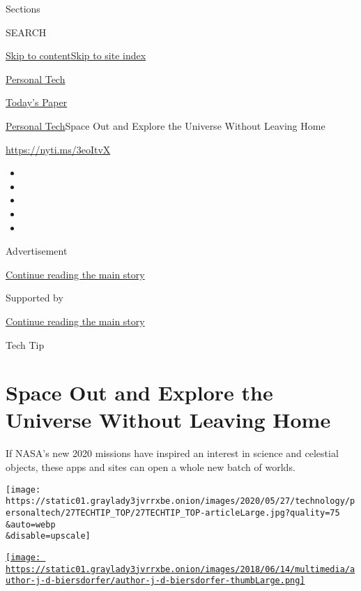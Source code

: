 Sections

SEARCH

\protect\hyperlink{site-content}{Skip to
content}\protect\hyperlink{site-index}{Skip to site index}

\href{https://www.nytimes3xbfgragh.onion/section/technology/personaltech}{Personal
Tech}

\href{https://myaccount.nytimes3xbfgragh.onion/auth/login?response_type=cookie\&client_id=vi}{}

\href{https://www.nytimes3xbfgragh.onion/section/todayspaper}{Today's
Paper}

\href{/section/technology/personaltech}{Personal Tech}\textbar{}Space
Out and Explore the Universe Without Leaving Home

\url{https://nyti.ms/3eoItvX}

\begin{itemize}
\item
\item
\item
\item
\item
\end{itemize}

Advertisement

\protect\hyperlink{after-top}{Continue reading the main story}

Supported by

\protect\hyperlink{after-sponsor}{Continue reading the main story}

Tech Tip

\hypertarget{space-out-and-explore-the-universe-without-leaving-home}{%
\section{Space Out and Explore the Universe Without Leaving
Home}\label{space-out-and-explore-the-universe-without-leaving-home}}

If NASA's new 2020 missions have inspired an interest in science and
celestial objects, these apps and sites can open a whole new batch of
worlds.

\texttt{[image: https://static01.graylady3jvrrxbe.onion/images/2020/05/27/technology/personaltech/27TECHTIP\_TOP/27TECHTIP\_TOP-articleLarge.jpg?quality=75\\\&auto=webp\\\&disable=upscale]}

\href{https://www.nytimes3xbfgragh.onion/by/j-d-biersdorfer}{\texttt{[image: https://static01.graylady3jvrrxbe.onion/images/2018/06/14/multimedia/author-j-d-biersdorfer/author-j-d-biersdorfer-thumbLarge.png]}}

